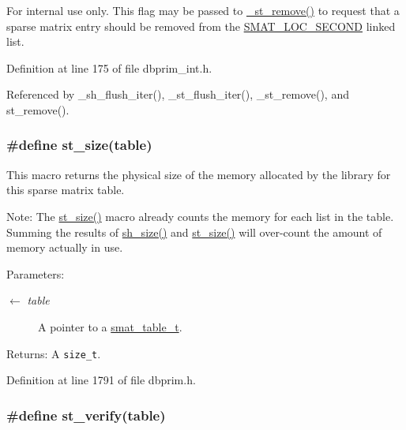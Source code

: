 \begin{Desc}
\item[For internal use only.]
This flag may be passed to \hyperlink{group__dbprim__smat_ga23}{\_\-st\_\-remove()} to request that a sparse matrix entry should be removed from the \hyperlink{group__dbprim__smat_gga70a138}{SMAT\_\-LOC\_\-SECOND} linked list.\end{Desc}


Definition at line 175 of file dbprim\_\-int.h.

Referenced by \_\-sh\_\-flush\_\-iter(), \_\-st\_\-flush\_\-iter(), \_\-st\_\-remove(), and st\_\-remove().\hypertarget{group__dbprim__smat_ga40}{
\subsubsection[st\_\-size]{\setlength{\rightskip}{0pt plus 5cm}\#define st\_\-size(table)}}
\label{group__dbprim__smat_ga40}


This macro returns the physical size of the memory allocated by the library for this sparse matrix table.

\begin{Desc}
\item[Note:]The \hyperlink{group__dbprim__smat_ga40}{st\_\-size()} macro already counts the memory for each list in the table. Summing the results of \hyperlink{group__dbprim__smat_ga53}{sh\_\-size()} and \hyperlink{group__dbprim__smat_ga40}{st\_\-size()} will over-count the amount of memory actually in use.\end{Desc}
\begin{Desc}
\item[Parameters:]
\begin{description}
\item[\mbox{$\leftarrow$} {\em table}]A pointer to a \hyperlink{group__dbprim__smat_ga0}{smat\_\-table\_\-t}.\end{description}
\end{Desc}
\begin{Desc}
\item[Returns:]A {\tt size\_\-t}.\end{Desc}


Definition at line 1791 of file dbprim.h.\hypertarget{group__dbprim__smat_ga34}{
\subsubsection[st\_\-verify]{\setlength{\rightskip}{0pt plus 5cm}\#define st\_\-verify(table)}}
\label{group__dbprim__smat_ga34}


